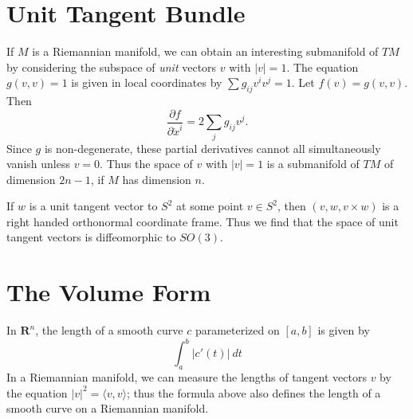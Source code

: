 \section{Unit Tangent Bundle}

If $M$ is a Riemannian manifold, we can obtain an interesting submanifold of $TM$ by considering the subspace of {\it unit} vectors $v$ with $|v| = 1$. The equation $g(v,v) = 1$ is given in local coordinates by $\sum g_{ij} v^i v^j = 1$. Let $f(v) = g(v,v)$. Then
%
\[ \frac{\partial f}{\partial \dot{x}^i} = 2 \sum_j g_{ij} v^j. \]
%
Since $g$ is non-degenerate, these partial derivatives cannot all simultaneously vanish unless $v = 0$. Thus the space of $v$ with $|v| = 1$ is a submanifold of $TM$ of dimension $2n - 1$, if $M$ has dimension $n$.

\begin{example}
    If $w$ is a unit tangent vector to $S^2$ at some point $v \in S^2$, then $(v,w,v \times w)$ is a right handed orthonormal coordinate frame. Thus we find that the space of unit tangent vectors is diffeomorphic to $SO(3)$.
\end{example}

\section{The Volume Form}

In $\mathbf{R}^n$, the length of a smooth curve $c$ parameterized on $[a,b]$ is given by
%
\[ \int_a^b |c'(t)|\ dt \]
%
In a Riemannian manifold, we can measure the lengths of tangent vectors $v$ by the equation $|v|^2 = \langle v, v \rangle$; thus the formula above also defines the length of a smooth curve on a Riemannian manifold.

